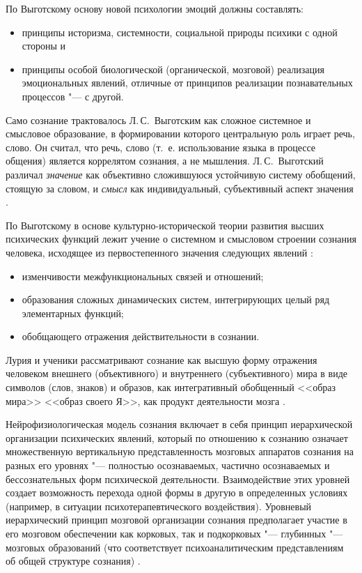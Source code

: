 \documentclass[a4paper,12pt]{article}
\begin{document}
	По Выготскому \cite{Vygotsky1984} основу новой психологии эмоций должны составлять:
	\begin{itemize}
		\item принципы историзма, системности, социальной природы психики с одной стороны и
		\item принципы особой биологической (органической, мозговой) реализация эмоциональных явлений, отличные от принципов реализации познавательных процессов "--- с другой.		
	\end{itemize}
	
	Само сознание трактовалось Л.\,С.~Выготским как сложное системное и смысловое образование, в формировании которого центральную роль играет  речь, слово. Он считал, что речь, слово (т.~е. использование языка в процессе общения) является коррелятом сознания, а не мышления. Л.\,С.~Выготский различал \textit{значение} как объективно сложившуюся устойчивую систему обобщений, стоящую за словом, и \textit{смысл} как индивидуальный, субъективный аспект значения \cite{Homskaya2015, Vygotsky1960}.
	
	По Выготскому в основе культурно-исторической теории развития высших психических функций лежит учение о системном и смысловом строении сознания человека, исходящее из первостепенного значения следующих явлений \cite{Homskaya2015}:
	\begin{itemize}
		\item изменчивости межфункциональных связей и отношений;
		\item образования сложных динамических систем, интегрирующих целый ряд элементарных функций;
		\item обобщающего отражения действительности в сознании.
	\end{itemize}
	
	Лурия и ученики рассматривают сознание как высшую форму отражения человеком внешнего (объективного) и внутреннего (субъективного) мира в виде символов (слов, знаков) и образов, как интегративный обобщенный <<образ мира>> <<образ своего Я>>, как продукт деятельности мозга \cite{Homskaya2015}.
	
	Нейрофизиологическая модель сознания включает в себя принцип иерархической организации психических явлений, который по отношению к сознанию означает множественную вертикальную представленность мозговых аппаратов сознания на разных его уровнях "--- полностью осознаваемых, частично осознаваемых и бессознательных форм психической деятельности. Взаимодействие этих уровней создает возможность перехода одной формы в другую в определенных условиях (например, в ситуации психотерапевтического воздействия). Уровневый иерархический принцип мозговой организации сознания предполагает участие в его мозговом обеспечении как корковых, так и подкорковых "--- глубинных "--- мозговых образований (что соответствует психоаналитическим представлениям об общей структуре сознания) \cite{Homskaya2015}.
	
\end{document}
